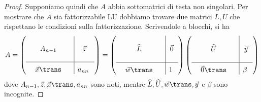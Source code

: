 \begin{proof}
    Supponiamo quindi che $A$ abbia sottomatrici di testa non singolari. Per mostrare che $A$ sia fattorizzabile LU dobbiamo trovare due matrici $L, U$ che rispettano le condizioni sulla fattorizzazione. Scrivendole a blocchi, si ha \[
        A = 
        \left( \begin{array}{@{}ccc|c}
            \; &             &\;   & \\
            \; &A_{n-1}      &\;   &\vec z \\
            \; &             &\;   & \\ 
                \hline \rule{0pt}{1.1\normalbaselineskip}
            \; &\vec x\trans &\;   &a_{nn}\;
        \end{array}\right)
        =
        \left( \begin{array}{@{}ccc|c}
            \; &             &\;   & \\
            \; &\widehat{L}  &\;   &\vec 0 \\
            \; &             &\;   & \\ 
                \hline \rule{0pt}{1.1\normalbaselineskip}
            \; &\vec w\trans &\;   &1\;
        \end{array}\right)
        \left( \begin{array}{@{}ccc|c}
            \; &             &\;   & \\
            \; &\widehat{U}  &\;   &\vec y \\
            \; &             &\;   & \\ 
                \hline \rule{0pt}{1.1\normalbaselineskip}
            \; &\vec 0\trans &\;   &\beta\;
        \end{array}\right)
    \] dove $A_{n-1}, \vec z, \vec x\trans, a_{nn}$ sono noti, mentre $\widehat{L}, \widehat{U}, \vec w\trans, \vec y$ e $\beta$ sono incognite.  


\end{proof}
